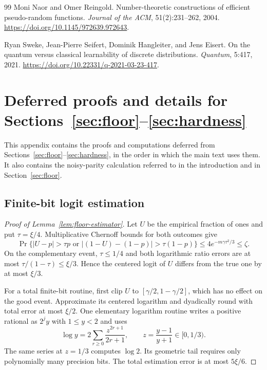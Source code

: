 \documentclass[11pt]{article}
\theoremstyle{definition}
\theoremstyle{remark}
\begin{document}
\begin{thebibliography}{99}
Moni Naor and Omer Reingold.
\newblock Number-theoretic constructions of efficient pseudo-random functions.
\newblock \emph{Journal of the ACM}, 51(2):231--262, 2004.
\newblock \url{https://doi.org/10.1145/972639.972643}.

Ryan Sweke, Jean-Pierre Seifert, Dominik Hangleiter, and Jens Eisert.
\newblock On the quantum versus classical learnability of discrete distributions.
\newblock \emph{Quantum}, 5:417, 2021.
\newblock \url{https://doi.org/10.22331/q-2021-03-23-417}.

\end{thebibliography}



\clearpage
\appendix


\section{\texorpdfstring{Deferred proofs and details for Sections~\ref*{sec:floor}--\ref*{sec:hardness}}{Deferred proofs and details for Sections 3-5}}\label{sec:deferred}

This appendix contains the proofs and computations deferred from Sections~\ref{sec:floor}--\ref{sec:hardness}, in the order in which the main text uses them. It also contains the noisy-parity calculation referred to in the introduction and in Section~\ref{sec:floor}.

\subsection{Finite-bit logit estimation}\label{sec:proof-floor-estimator}

\begin{proof}[Proof of Lemma~\ref{lem:floor-estimator}]
Let $U$ be the empirical fraction of ones and put $\tau=\xi/4$. Multiplicative Chernoff bounds for both outcomes give
\[
\Pr\{|U-p|>\tau p\text{ or }|(1-U)-(1-p)|>\tau(1-p)\}
\le4e^{-m\gamma\tau^2/3}\le\zeta.
\]
On the complementary event, $\tau\le1/4$ and both logarithmic ratio errors are at most $\tau/(1-\tau)\le\xi/3$. Hence the centered logit of $U$ differs from the true one by at most $\xi/3$.

For a total finite-bit routine, first clip $U$ to $[\gamma/2,1-\gamma/2]$, which has no effect on the good event. Approximate its centered logarithm and dyadically round with total error at most $\xi/2$. One elementary logarithm routine writes a positive rational as $2^jy$ with $1\le y<2$ and uses
\[
\log y=2\sum_{r\ge0}\frac{z^{2r+1}}{2r+1},
\qquad z=\frac{y-1}{y+1}\in[0,1/3).
\]
The same series at $z=1/3$ computes $\log2$. Its geometric tail requires only polynomially many precision bits. The total estimation error is at most $5\xi/6$.
\end{proof}
\end{document}
